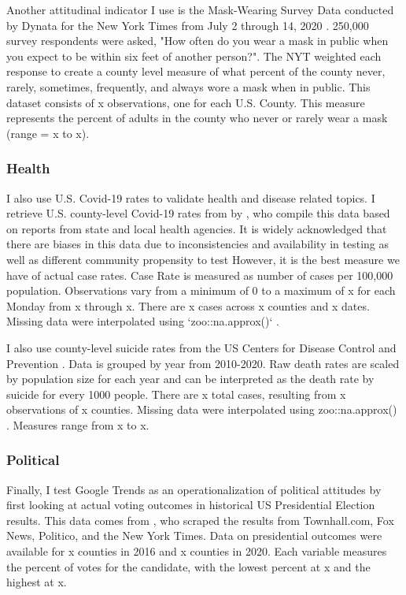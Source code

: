Another attitudinal indicator I use is the Mask-Wearing Survey Data conducted by
Dynata for the New York Times from July 2 through 14, 2020 \citep{mask_data}. 250,000
survey respondents were asked, "How often do you wear a mask in public when you
expect to be within six feet of another person?". The NYT weighted each response
to create a county level measure of what percent of the county never, rarely,
sometimes, frequently, and always wore a mask when in public. This dataset
consists of x observations, one for each U.S. County. This measure
represents the percent of adults in the county who never or rarely wear a mask
(range = x to x).

\subsubsection{Health}


I also use U.S. Covid-19 rates to validate health and disease related topics. I
retrieve U.S. county-level Covid-19 rates from by \citet{covid_data}, who compile this
data based on reports from state and local health agencies. It is widely
acknowledged that there are biases in this data due to inconsistencies and
availability in testing as well as different community propensity to test
\citep{gu22, cdc20a} However, it is the best measure we have of actual case rates.
Case Rate is measured as number of cases per 100,000 population. Observations
vary from a minimum of 0 to a maximum of x for each 
Monday from x through x. There are x cases across x counties and x dates. Missing data were interpolated using `zoo::na.approx()` \citep{zoo}.

I also use county-level suicide rates from the US Centers for Disease Control
and Prevention \citeyearpar{suic_data}. Data is grouped by year from 2010-2020. Raw death
rates are scaled by population size for each year and can be interpreted as the
death rate by suicide for every 1000 people. There are x total
cases, resulting from x observations of x counties. Missing data were interpolated using
zoo::na.approx() \citep{zoo}. Measures range from x to x.

\subsubsection{Political}

Finally, I test Google Trends as an operationalization of political
attitudes by first looking at actual voting outcomes in historical US
Presidential Election results. This data comes from  \citet{pres_data}, who scraped the
results from Townhall.com, Fox News, Politico, and the New York Times. Data on 
presidential outcomes were available for x counties in 2016 and
x counties in 2020. Each variable measures the percent of votes
for the candidate, with the lowest percent at x and the highest at x. 

